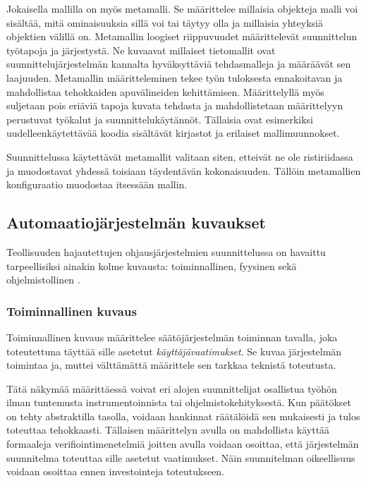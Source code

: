 \documentclass[finnish,12pt]{article}
\begin{document}
Jokaisella mallilla on myös metamalli. Se määrittelee millaisia objekteja malli voi sisältää, mitä ominaisuuksia sillä voi tai täytyy olla ja millaisia yhteyksiä objektien välillä on.
Metamallin loogiset riippuvuudet määrittelevät suunnittelun työtapoja ja järjestystä.
Ne kuvaavat millaiset tietomallit ovat suunnittelujärjestelmän kannalta hyväksyttäviä tehdasmalleja ja
määräävät sen laajuuden. Metamallin määritteleminen tekee työn tuloksesta ennakoitavan ja mahdollistaa tehokkaiden apuvälineiden kehittämisen.
Määrittelyllä myös suljetaan pois eriäviä tapoja kuvata tehdasta ja mahdollistetaan määrittelyyn perustuvat työkalut ja suunnittelukäytännöt.
Tällaisia ovat esimerkiksi uudelleenkäytettävää koodia sisältävät kirjastot ja erilaiset mallimuunnokset.

Suunnittelussa käytettävät metamallit valitaan siten, etteivät ne ole ristiriidassa ja muodostavat yhdessä toisiaan täydentävän kokonaisuuden.
Tällöin metamallien konfiguraatio muodostaa itsessään mallin.


	\subsection{Automaatiojärjestelmän kuvaukset}

Teollisuuden hajautettujen ohjausjärjestelmien suunnittelussa on havaittu
tarpeellisiksi ainakin kolme kuvausta: toiminnallinen, fyysinen sekä ohjelmistollinen \cite{RefWorks:38}.

		\subsubsection{Toiminnallinen kuvaus}

Toiminnallinen kuvaus määrittelee säätöjärjestelmän toiminnan tavalla, joka toteutettuna täyttää sille asetetut \emph{käyttäjävaatimukset}.
Se kuvaa järjestelmän toimintaa ja, muttei välttämättä määrittele sen tarkkaa teknistä toteutusta. \cite{RefWorks:60}

Tätä näkymää määrittäessä voivat eri alojen suunnittelijat osallistua työhön ilman
tuntemusta instrumentoinnista tai ohjelmistokehityksestä. Kun päätökset on tehty
abstraktilla tasolla, voidaan hankinnat räätälöidä sen mukaisesti ja tulos
toteuttaa tehokkaasti.
Tällaisen määrittelyn avulla on mahdollista käyttää formaaleja verifiointimenetelmiä joitten avulla
voidaan osoittaa, että järjestelmän suunnitelma toteuttaa sille asetetut vaatimukset.
Näin suunnitelman oikeellisuus voidaan osoittaa ennen investointeja toteutukseen. \cite{RefWorks:41}
\end{document}
